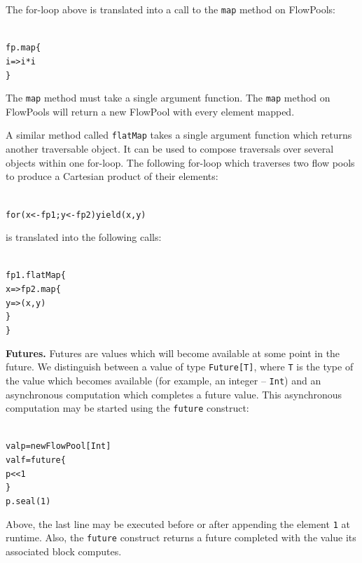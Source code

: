 \documentclass[runningheads,a4paper]{llncs}
\begin{document}
The for-loop above is translated into a call to the \verb=map= method on FlowPools:

\begin{minipage}[b]{3.75 cm}
\begin{alltt}
{\scriptsize
fp.map \{
  i => i * i
\}
}
\end{alltt}
\end{minipage}

The \verb=map= method must take a single argument function.
The \verb=map= method on FlowPools will return a new FlowPool with every
element mapped.

A similar method called \verb=flatMap= takes a single argument function
which returns another traversable object.
It can be used to compose traversals over several objects within one
for-loop.
The following for-loop which traverses two flow pools to produce a
Cartesian product of their elements:

\begin{minipage}[b]{3.75 cm}
\begin{alltt}
{\scriptsize
for (x <- fp1; y <- fp2) yield (x, y)
}
\end{alltt}
\end{minipage}

is translated into the following calls:

\begin{minipage}[b]{3.75 cm}
\begin{alltt}
{\scriptsize
fp1.flatMap \{
  x => fp2.map \{
    y => (x, y)
  \}
\}
}
\end{alltt}
\end{minipage}


\textbf{Futures.}
Futures are values which will become available at some point in the future.
We distinguish between a value of type \verb=Future[T]=, where \verb=T= is
the type of the value which becomes available (for example, an
integer -- \verb=Int=) and an asynchronous computation which completes a
future value.
This asynchronous computation may be started using the \verb=future= construct:

\begin{minipage}[b]{3.75 cm}
\begin{alltt}
{\scriptsize
val p = new FlowPool[Int]
val f = future \{
  p << 1
\}
p.seal(1)
}
\end{alltt}
\end{minipage}

Above, the last line may be executed before or after appending the element
\verb=1= at runtime.
Also, the \verb=future= construct returns a future completed with the value
its associated block computes.
\end{document}
